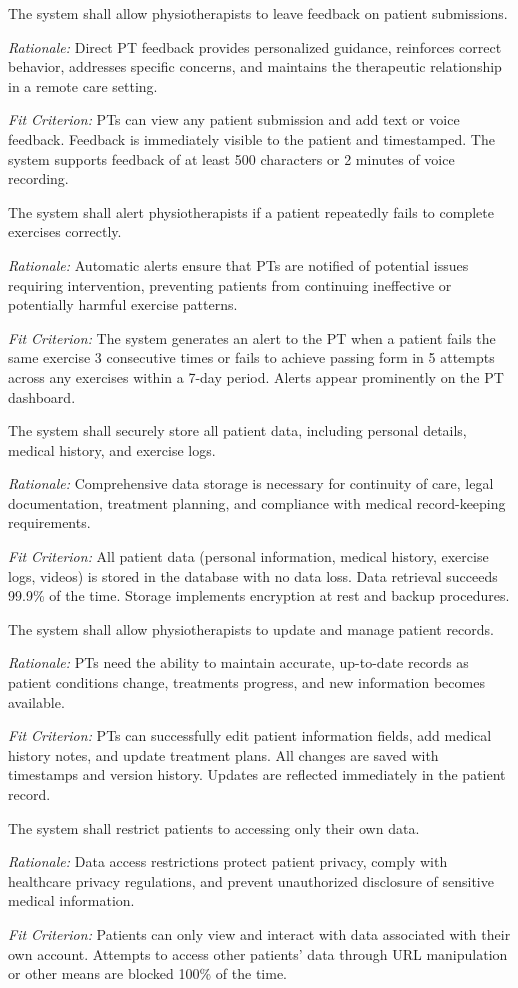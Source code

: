 \documentclass[12pt]{article}
\newcommand{\rationale}[1]{\par\emph{Rationale:} #1}
\newcommand{\fitcrit}[1]{\par\emph{Fit Criterion:} #1}
\begin{document}
\begin{reqlist}
	\item[FR 19.] The system shall allow physiotherapists to leave feedback on patient submissions.
	\rationale{Direct PT feedback provides personalized guidance, reinforces correct behavior, addresses specific concerns, and maintains the therapeutic relationship in a remote care setting.}
	\fitcrit{PTs can view any patient submission and add text or voice feedback. Feedback is immediately visible to the patient and timestamped. The system supports feedback of at least 500 characters or 2 minutes of voice recording.}
	
	\item[FR 20.] The system shall alert physiotherapists if a patient repeatedly fails to complete exercises correctly.
	\rationale{Automatic alerts ensure that PTs are notified of potential issues requiring intervention, preventing patients from continuing ineffective or potentially harmful exercise patterns.}
	\fitcrit{The system generates an alert to the PT when a patient fails the same exercise 3 consecutive times or fails to achieve passing form in 5 attempts across any exercises within a 7-day period. Alerts appear prominently on the PT dashboard.}
	
	\item[FR 21.] The system shall securely store all patient data, including personal details, medical history, and exercise logs.
	\rationale{Comprehensive data storage is necessary for continuity of care, legal documentation, treatment planning, and compliance with medical record-keeping requirements.}
	\fitcrit{All patient data (personal information, medical history, exercise logs, videos) is stored in the database with no data loss. Data retrieval succeeds 99.9\% of the time. Storage implements encryption at rest and backup procedures.}
	
	\item[FR 22.] The system shall allow physiotherapists to update and manage patient records.
	\rationale{PTs need the ability to maintain accurate, up-to-date records as patient conditions change, treatments progress, and new information becomes available.}
	\fitcrit{PTs can successfully edit patient information fields, add medical history notes, and update treatment plans. All changes are saved with timestamps and version history. Updates are reflected immediately in the patient record.}
	
	\item[FR 23.] The system shall restrict patients to accessing only their own data.
	\rationale{Data access restrictions protect patient privacy, comply with healthcare privacy regulations, and prevent unauthorized disclosure of sensitive medical information.}
	\fitcrit{Patients can only view and interact with data associated with their own account. Attempts to access other patients' data through URL manipulation or other means are blocked 100\% of the time.}
	

\end{reqlist}
\end{document}
